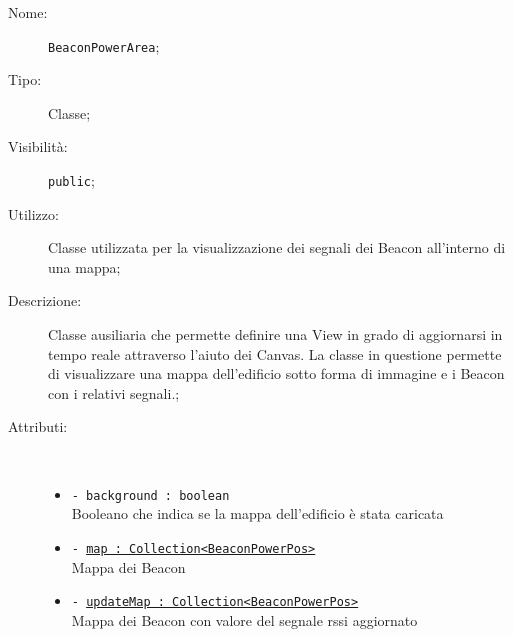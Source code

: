 \documentclass[../DefinizioneDiProdotto.tex]{subfiles}
\begin{document}
\begin{description}
	\item[Nome:] \texttt{BeaconPowerArea};
	\item[Tipo:] Classe;
	\item[Visibilità:] \texttt{public};
	\item[Utilizzo:] Classe utilizzata per la visualizzazione dei segnali dei Beacon all'interno di una mappa;
	\item[Descrizione:] Classe ausiliaria che permette definire una View in grado di aggiornarsi in tempo reale attraverso
	l'aiuto dei Canvas. La classe in questione permette di visualizzare una mappa dell'edificio sotto forma di immagine e i Beacon con i relativi segnali.;
	\item[Attributi:] \
	\begin{itemize}
		\item \texttt{- background : boolean}\\
		Booleano che indica se la mappa dell'edificio è stata caricata
		
		\item \texttt{- \underline{map : Collection<BeaconPowerPos>}}\\
		Mappa dei Beacon
		
		\item \texttt{- \underline{updateMap : Collection<BeaconPowerPos>}}\\
		Mappa dei Beacon con valore del segnale rssi aggiornato
		

\end{itemize}
\end{description}
\end{document}
